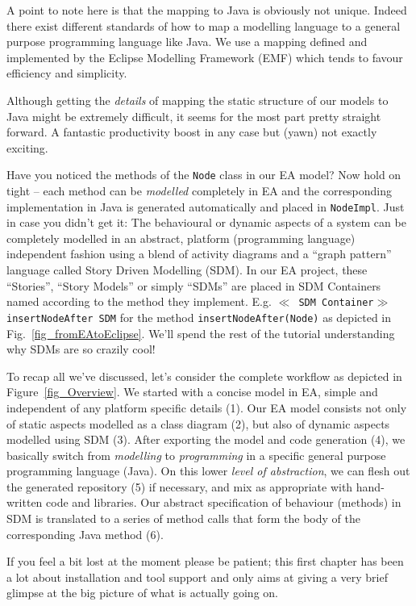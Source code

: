 A point to note here is that the mapping to Java is obviously not unique. 
Indeed there exist different standards of how to map a modelling language to a general purpose programming language like Java. 
We use a mapping defined and implemented by the Eclipse Modelling Framework (EMF) which tends to favour efficiency and simplicity.

Although getting the \emph{details} of mapping the static structure of our models to Java might be extremely difficult, it seems for the most part pretty straight  forward.  
A fantastic productivity boost in any case but (yawn) not exactly exciting.

Have you noticed the methods of the \texttt{Node} class in our EA model? 
Now hold on tight -- each method can be \emph{modelled} completely in EA and the corresponding implementation in Java is generated automatically and placed in \texttt{NodeImpl}.  
Just in case you didn't get it: The behavioural or dynamic aspects of a system can be completely modelled in an abstract, platform (programming language) independent fashion using a blend of activity  diagrams and a ``graph pattern'' language called Story Driven Modelling (SDM).  
In our EA project, these ``Stories'', ``Story Models'' or simply ``SDMs'' are  placed in SDM Containers named according to the method they implement.  
E.g.  \texttt{$\ll$ SDM Container$\gg$ insertNodeAfter SDM} for the method  \texttt{insertNodeAfter(Node)} as depicted in
Fig.~\ref{fig_fromEAtoEclipse}.  
We'll spend the rest of the tutorial understanding why SDMs are so  {\huge crazily} cool!
 
To recap all we've discussed, let's consider the complete workflow as depicted in Figure~\ref{fig_Overview}. 
We started with a concise model in EA, simple and independent of any platform specific details (1).  
Our EA model consists not only of static aspects modelled as a class diagram (2), but also of dynamic
aspects modelled using SDM (3).  After exporting the model and code generation (4), we basically switch from \emph{modelling} to \emph{programming} in a specific general purpose programming language (Java).  
On this lower \emph{level of abstraction}, we can flesh out the generated repository (5) if necessary, and mix as appropriate with hand-written code and libraries.  Our abstract specification of behaviour (methods) in SDM is translated to a series of method calls that form the body of the corresponding Java method (6).

If you feel a bit lost at the moment please be patient; this first chapter has been a lot about installation and tool support and only aims at giving a very brief glimpse at the big picture of what is actually going on.    

